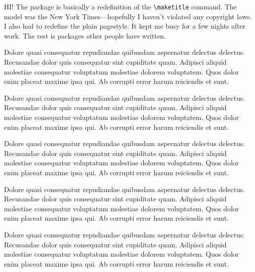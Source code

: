 \documentclass{article}
\date{\today}
\begin{document}
\maketitle

\begin{multicols}{2}{


\Large

HI! The package is basically a redefinition of the \verb+\maketitle+ command.  The model was the New York Times---hopefully I haven't violated any copyright laws.  I also had to redefine the plain pagestyle.  It kept me busy for a few nights after work.  The rest is packages other people have written.      

Dolore quasi consequatur repudiandae quibusdam aspernatur delectus delectus. Recusandae dolor quis consequatur sint cupiditate quam. Adipisci aliquid molestiae consequatur voluptatum molestiae dolorem voluptatem. Quos dolor enim placeat maxime ipsa qui. Ab corrupti error harum reiciendis et sunt.

Dolore quasi consequatur repudiandae quibusdam aspernatur delectus delectus. Recusandae dolor quis consequatur sint cupiditate quam. Adipisci aliquid molestiae consequatur voluptatum molestiae dolorem voluptatem. Quos dolor enim placeat maxime ipsa qui. Ab corrupti error harum reiciendis et sunt.

Dolore quasi consequatur repudiandae quibusdam aspernatur delectus delectus. Recusandae dolor quis consequatur sint cupiditate quam. Adipisci aliquid molestiae consequatur voluptatum molestiae dolorem voluptatem. Quos dolor enim placeat maxime ipsa qui. Ab corrupti error harum reiciendis et sunt.

Dolore quasi consequatur repudiandae quibusdam aspernatur delectus delectus. Recusandae dolor quis consequatur sint cupiditate quam. Adipisci aliquid molestiae consequatur voluptatum molestiae dolorem voluptatem. Quos dolor enim placeat maxime ipsa qui. Ab corrupti error harum reiciendis et sunt.

Dolore quasi consequatur repudiandae quibusdam aspernatur delectus delectus. Recusandae dolor quis consequatur sint cupiditate quam. Adipisci aliquid molestiae consequatur voluptatum molestiae dolorem voluptatem. Quos dolor enim placeat maxime ipsa qui. Ab corrupti error harum reiciendis et sunt.

}
\end{multicols}
\end{document}
